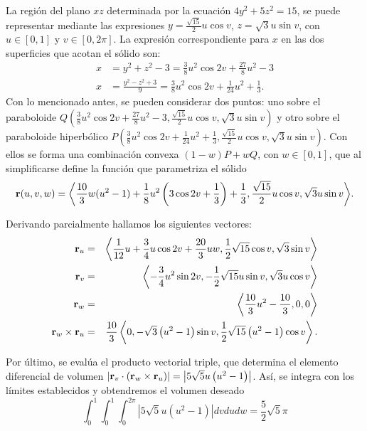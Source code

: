 \begin{parrafonumerado}
La región del plano $xz$ determinada por la ecuación $4y^{2}+5z^{2}=15$, se puede representar mediante las expresiones $y=\frac{\sqrt{15}}{2}u\cos v$, $z=\sqrt{3}u\sin v$, con $u \in [0,1]$ y $v \in [0,2\pi]$. La expresión correspondiente para $x$ en las dos superficies que acotan el sólido son:
%
\begin{align*}
x &=y^{2}+z^{2}-3= \frac{3}{8}u^{2}\cos 2v+\frac{27}{8}u^{2}-3\\
x &=\frac{y^{2}-z^{2}+3}{9}= \frac{3}{8}u^{2}\cos 2v+\frac{1}{24}u^{2}+\frac{1}{3}.
\end{align*}
%
Con lo mencionado antes,
se pueden considerar dos puntos: uno sobre el paraboloide {\small $Q\left( \frac{3}{8}u^{2}\cos 2v+\frac{27}{8}u^{2}-3,\frac{\sqrt{15}}{2}u\cos v,\sqrt{3}u\sin v\right)$} y otro sobre el paraboloide hiperbólico
{\small $P\left(\frac{3}{8}u^{2}\cos2v+\frac{1}{24}u^{2}+\frac{1}{3},\frac{\sqrt{15}}{2}u\cos v,\sqrt{3}u\sin v\right).$}
Con ellos se forma una combinación convexa {\small $(1-w) P +wQ$, con $w \in [0,1]$,} que al simplificarse define la función que parametriza el sólido
\begin{gather*}
{\bf r}(u,v,w)= \bigg\langle \frac{10}{3}w(u^{2}-1)+\frac{1}{8}u^{2}\left(3\cos 2v+\frac{1}{3}\right)+\frac{1}{3},
\frac{\sqrt{15}}{2}u\cos v,\sqrt{3}u\sin v \bigg\rangle.
\end{gather*}

Derivando parcialmente hallamos los siguientes vectores:
%
{\small
\begin{eqnarray*}
  {\bf r}_{u} &=&\left\langle \frac{1}{12}u+\frac{3}{4}u\cos 2v+\frac{20}{3}uw,\frac{1}{2}\sqrt{15}\cos v,\sqrt{3}\sin v\right\rangle\\
  {\bf r}_{v}&=&\left\langle -\frac{3}{4}u^{2}\sin 2v,-\frac{1}{2}\sqrt{15}u\sin v,\sqrt{3}u\cos v\right\rangle  \\
  {\bf r}_{w}&=&\left\langle \frac{10}{3}u^{2}-\frac{10}{3},0,0\right\rangle  \\
  {\bf r}_{w}\times {\bf r}_{u}&=& \frac{10}{3} \left\langle 0,-\sqrt{3}\left( u^{2}-1\right) \sin v,\frac{1}{2}\sqrt{15}\left( u^{2}-1\right) \cos v \right\rangle.
\end{eqnarray*}
}

Por último, se evalúa el producto vectorial triple, que determina el ele\-mento diferencial de volumen
$\left\vert {\bf r}_{v}\cdot \left({\bf r}_{w}\times {\bf r}_{u}\right) \right\vert= \left\vert 5\sqrt{5}u\left( u^{2}-1\right) \right\vert$. Así, se integra con los límites establecidos y obtendremos el volumen deseado
\begin{equation}\label{ejercicio9}
\int_{0}^{1}\int_{0}^{1}\int_{0}^{2\pi }\left\vert 5\sqrt{5}u\left(u^{2}-1\right) \right\vert dvdudw= \frac{5}{2}\sqrt{5}\pi
\end{equation}


\end{parrafonumerado}
